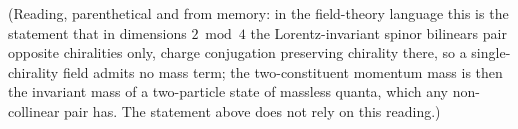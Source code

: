 (Reading, parenthetical and from memory: in the field-theory language this is the statement that in dimensions $2 \bmod 4$ the Lorentz-invariant spinor bilinears pair opposite chiralities only, charge conjugation preserving chirality there, so a single-chirality field admits no mass term; the two-constituent momentum mass is then the invariant mass of a two-particle state of massless quanta, which any non-collinear pair has. The statement above does not rely on this reading.)
